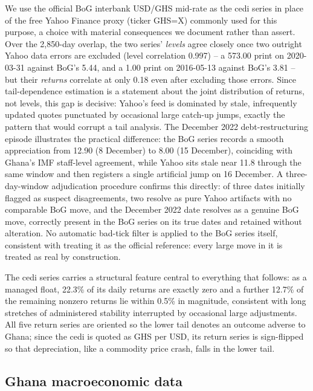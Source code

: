 \documentclass[final,3p,times,authoryear]{elsarticle}
\begin{document}
We use the official BoG interbank USD/GHS mid-rate as the cedi series in
place of the free Yahoo Finance proxy (ticker GHS=X) commonly used for
this purpose, a choice with material consequences we document rather
than assert. Over the 2,850-day overlap, the two series' \emph{levels}
agree closely once two outright Yahoo data errors are excluded (level
correlation 0.997) -- a 573.00 print on 2020-03-31 against BoG's 5.44,
and a 1.00 print on 2016-05-13 against BoG's 3.81 -- but their
\emph{returns} correlate at only 0.18 even after excluding those errors.
Since tail-dependence estimation is a statement about the joint
distribution of returns, not levels, this gap is decisive: Yahoo's feed
is dominated by stale, infrequently updated quotes punctuated by
occasional large catch-up jumps, exactly the pattern that would corrupt
a tail analysis. The December 2022 debt-restructuring episode
illustrates the practical difference: the BoG series records a smooth
appreciation from 12.90 (8 December) to 8.00 (15 December), coinciding
with Ghana's IMF staff-level agreement, while Yahoo sits stale near 11.8
through the same window and then registers a single artificial jump on
16 December. A three-day-window adjudication procedure confirms this
directly: of three dates initially flagged as suspect disagreements, two
resolve as pure Yahoo artifacts with no comparable BoG move, and the
December 2022 date resolves as a genuine BoG move, correctly present in
the BoG series on its true dates and retained without alteration. No
automatic bad-tick filter is applied to the BoG series itself, consistent
with treating it as the official reference: every large move in it is
treated as real by construction.

The cedi series carries a structural feature central to everything that
follows: as a managed float, 22.3\% of its daily returns are exactly
zero and a further 12.7\% of the remaining nonzero returns lie within
0.5\% in magnitude, consistent with long stretches of administered
stability interrupted by occasional large adjustments. All five return
series are oriented so the lower tail denotes an outcome adverse to
Ghana; since the cedi is quoted as GHS per USD, its return series is
sign-flipped so that depreciation, like a commodity price crash, falls
in the lower tail.

\subsection{Ghana macroeconomic data}
\label{sec:macro-data}
\end{document}
